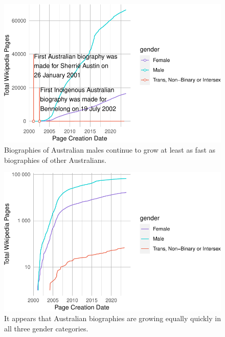 \documentclass[
  a4paper,
  DIV=11,
  numbers=noendperiod]{scrreprt}
\begin{document}
\begin{figure}

{\centering \includegraphics{who-counts_files/figure-pdf/fig-gender-by-page-creation-1.pdf}

}

\caption{\label{fig-gender-by-page-creation}Biographies of Australian
males continue to grow at least as fast as biographies of other
Australians.}

\end{figure}

\begin{figure}

{\centering \includegraphics{who-counts_files/figure-pdf/fig-gender-by-page-creation-log-1.pdf}

}

\caption{\label{fig-gender-by-page-creation-log}It appears that
Australian biographies are growing equally quickly in all three gender
categories.}

\end{figure}
\end{document}
